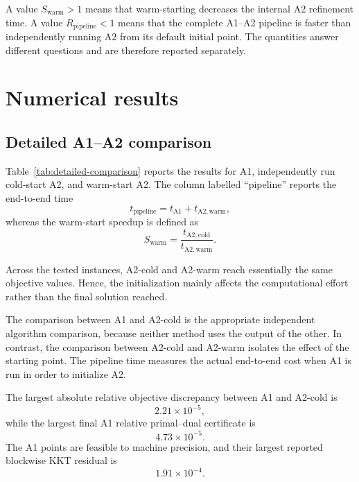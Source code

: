 \documentclass[12pt]{article}
\begin{document}
A value $S_{\mathrm{warm}}>1$ means that warm-starting decreases the
internal A2 refinement time. A value
$R_{\mathrm{pipeline}}<1$ means that the complete A1--A2 pipeline is
faster than independently running A2 from its default initial point.
The quantities answer different questions and are therefore reported
separately.

\section{Numerical results}

\subsection{Detailed A1--A2 comparison}

Table~\ref{tab:detailed-comparison} reports the results for A1,
independently run cold-start A2, and warm-start A2. The column labelled
``pipeline'' reports the end-to-end time
\[
t_{\mathrm{pipeline}}
=
t_{\mathrm{A1}}+t_{\mathrm{A2,warm}},
\]
whereas the warm-start speedup is defined as
\[
S_{\mathrm{warm}}
=
\frac{t_{\mathrm{A2,cold}}}
     {t_{\mathrm{A2,warm}}}.
\]

\begin{table}[htbp]
    \centering
    \caption{Detailed comparison of A1, cold-start A2, and warm-start
    A2. The pipeline time is
    $t_{\mathrm{A1}}+t_{\mathrm{A2,warm}}$, while the warm-start
    speedup is
    $t_{\mathrm{A2,cold}}/t_{\mathrm{A2,warm}}$.}
    \label{tab:detailed-comparison}
    \resizebox{\textwidth}{!}{%
        
    }
\end{table}

Across the tested instances, A2-cold and A2-warm reach essentially the
same objective values. Hence, the initialization mainly affects the
computational effort rather than the final solution reached.

The comparison between A1 and A2-cold is the appropriate independent
algorithm comparison, because neither method uses the output of the
other. In contrast, the comparison between A2-cold and A2-warm isolates
the effect of the starting point. The pipeline time measures the actual
end-to-end cost when A1 is run in order to initialize A2.

The largest absolute relative objective discrepancy between A1 and
A2-cold is
\[
2.21\times 10^{-5},
\]
while the largest final A1 relative primal--dual certificate is
\[
4.73\times 10^{-5}.
\]
The A1 points are feasible to machine precision, and their largest
reported blockwise KKT residual is
\[
1.91\times 10^{-4}.
\]
\end{document}

